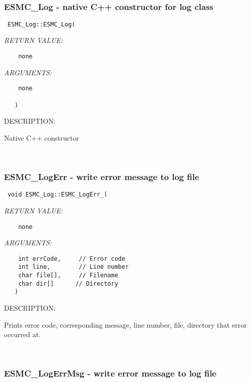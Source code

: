 \mbox{}\hrulefill\ 
 
\subsubsection [ESMC\_Log] {ESMC\_Log - native C++ constructor for log class}


  
\begin{verbatim} 
 ESMC_Log::ESMC_Log(
 \end{verbatim}{\em RETURN VALUE:}
\begin{verbatim}    none\end{verbatim}{\em ARGUMENTS:}
\begin{verbatim}    none
 
   )
 \end{verbatim}
{\sf DESCRIPTION:\\ }


     Native C++ constructor 
 
\mbox{}\hrulefill\ 
 
\subsubsection [ESMC\_LogErr] {ESMC\_LogErr - write error message to log file}


  
\begin{verbatim} 
 void ESMC_Log::ESMC_LogErr_(
 \end{verbatim}{\em RETURN VALUE:}
\begin{verbatim}    none\end{verbatim}{\em ARGUMENTS:}
\begin{verbatim} 
    int errCode,     // Error code
    int line,        // Line number
    char file[],     // Filename
    char dir[]      // Directory
   )\end{verbatim}
{\sf DESCRIPTION:\\ }


   Prints error code, corresponding message, line number, file, directory
   that error occurred at.  
 
\mbox{}\hrulefill\ 
 
\subsubsection [ESMC\_LogErrMsg] {ESMC\_LogErrMsg - write error message to log file}


